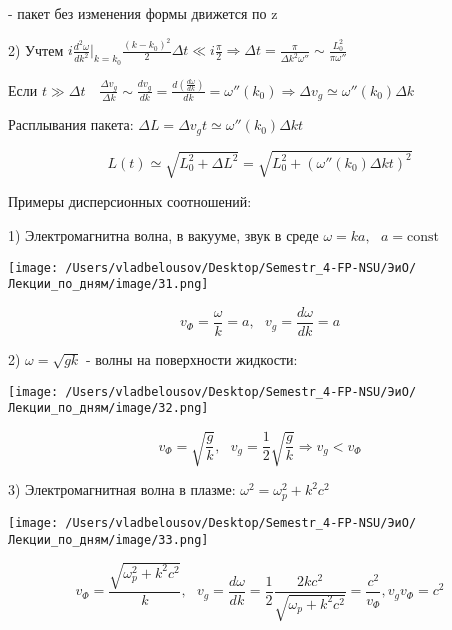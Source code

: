 \documentclass[12pt, a4paper]{report}
\begin{document}
- пакет без изменения формы движется по z 

2) Учтем \( \displaystyle i\frac{d ^2\omega }{dk ^2 } \bigg |_{k = k_0}  \frac{(k-k_0 ) ^2 }{2} \Delta t  \ll i \frac{\pi}{2 }  \Rightarrow \Delta t = \frac{\pi}{\Delta k ^2 \omega ''}\sim \frac{ L_0 ^2 }{ \pi \omega ''}        \) 

Если \( \displaystyle t \gg \Delta t    \quad  \frac{\Delta v_g }{\Delta k } \sim \frac{d v_g }{dk } = \frac{d \left( \frac{d \omega}{dk}  \right)}{dk}= \omega '' (k_0 ) \Rightarrow \Delta v_g \simeq \omega '' (k_0 )\Delta k       \) 

Расплывания пакета: \( \Delta L= \Delta v_g t \simeq \omega '' ( k_0 ) \Delta k t   \) 

\[ L(t  ) \simeq \sqrt{L_0 ^2 + \Delta L  ^2 } = \sqrt{ L_0 ^2 + ( \omega '' (k_0  )\Delta k t) ^2 }   \] 

Примеры дисперсионных соотношений: 

1) Электромагнитна волна, в вакууме, звук в среде \( \omega = k a , \text{ }  a = \mathrm{const}   \) 

\begin{center}
    \texttt{[image: /Users/vladbelousov/Desktop/Semestr\_4-FP-NSU/ЭиО/Лекции\_по\_дням/image/31.png]}
\end{center}

\[ v_{\Phi  } = \frac{\omega}{ k }  = a, \text{ }  v_g = \frac{ d \omega }{ d k}= a    \] 

2) \( \omega = \sqrt{gk } \) - волны на поверхности жидкости: 

\begin{center}
    \texttt{[image: /Users/vladbelousov/Desktop/Semestr\_4-FP-NSU/ЭиО/Лекции\_по\_дням/image/32.png]}
\end{center}

\[ v_{\Phi } = \sqrt{\frac{g}{k} }, \text{ }  v_g = \frac{1}{ 2} \sqrt{\frac{g}{k} } \Rightarrow v_g< v_{\Phi}     \] 

3) Электромагнитная волна в плазме: \( \omega ^2 = \omega_p ^2 + k ^2 c ^2  \) 

\begin{center}
    \texttt{[image: /Users/vladbelousov/Desktop/Semestr\_4-FP-NSU/ЭиО/Лекции\_по\_дням/image/33.png]}
\end{center}

\[ v_{\Phi }  = \frac{\sqrt{ \omega_p ^2 + k ^2  c ^2 }}{k }, \text{ }  v_g = \frac{d \omega }{dk } =\frac{1}{2 }  \frac{2 k c ^2 }{\sqrt{ \omega_p + k ^2 c ^2 }} = \frac{ c ^2 }{v_{\Phi} } , v_g v_{\Phi }  = c ^2   \] 
\end{document}
